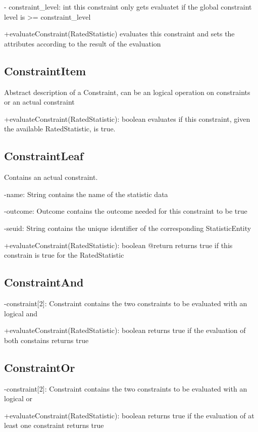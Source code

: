 	- constraint\_level: int
		this constraint only gets evaluatet if the global constraint level is >= constraint\_level


	+evaluateConstraint(RatedStatistic)
		evaluates this constraint and sets the attributes according to the result of the evaluation



\subsection{ConstraintItem}
	Abstract description of a Constraint, can be an logical operation on constraints or an actual constraint

	+evaluateConstraint(RatedStatistic): boolean
		evaluates if this constraint, given the available RatedStatistic, is true. 



\subsection{ConstraintLeaf}
	Contains an actual constraint.

	-name: String
		contains the name of the statistic data

	-outcome: Outcome
		contains the outcome needed for this constraint to be true

	-seuid: String
		contains the unique identifier of the corresponding StatisticEntity


	+evaluateConstraint(RatedStatistic): boolean
		@return returns true if this constrain is true for the RatedStatistic



\subsection{ConstraintAnd}
	-constraint[2]: Constraint
		contains the two constraints to be evaluated with an logical and
	
	+evaluateConstraint(RatedStatistic): boolean
		returns true if the evaluation of both constains returns true



\subsection{ConstraintOr}
	-constraint[2]: Constraint
		contains the two constraints to be evaluated with an logical or
	
	+evaluateConstraint(RatedStatistic): boolean
		returns true if the evaluation of at least one constraint returns true



